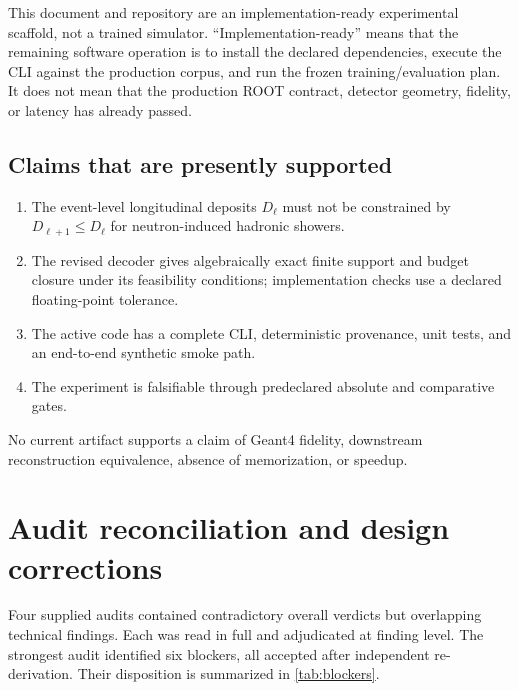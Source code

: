 \documentclass[10pt,a4paper]{article}
\begin{document}
This document and repository are an implementation-ready experimental scaffold, not a trained simulator. ``Implementation-ready'' means that the remaining software operation is to install the declared dependencies, execute the CLI against the production corpus, and run the frozen training/evaluation plan. It does not mean that the production ROOT contract, detector geometry, fidelity, or latency has already passed.

\subsection{Claims that are presently supported}
\begin{enumerate}
\item The event-level longitudinal deposits $D_\ell$ must not be constrained by $D_{\ell+1}\le D_\ell$ for neutron-induced hadronic showers.
\item The revised decoder gives algebraically exact finite support and budget closure under its feasibility conditions; implementation checks use a declared floating-point tolerance.
\item The active code has a complete CLI, deterministic provenance, unit tests, and an end-to-end synthetic smoke path.
\item The experiment is falsifiable through predeclared absolute and comparative gates.
\end{enumerate}

No current artifact supports a claim of Geant4 fidelity, downstream reconstruction equivalence, absence of memorization, or speedup.

\section{Audit reconciliation and design corrections}

Four supplied audits contained contradictory overall verdicts but overlapping technical findings. Each was read in full and adjudicated at finding level. The strongest audit identified six blockers, all accepted after independent re-derivation. Their disposition is summarized in \cref{tab:blockers}.
\end{document}
